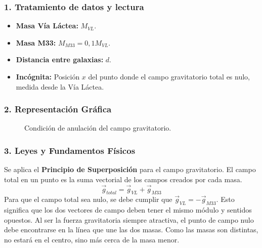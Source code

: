 \subsubsection*{1. Tratamiento de datos y lectura}
\begin{itemize}
    \item \textbf{Masa Vía Láctea:} $M_{VL}$.
    \item \textbf{Masa M33:} $M_{M33} = 0,1 M_{VL}$.
    \item \textbf{Distancia entre galaxias:} $d$.
    \item \textbf{Incógnita:} Posición $x$ del punto donde el campo gravitatorio total es nulo, medida desde la Vía Láctea.
\end{itemize}

\subsubsection*{2. Representación Gráfica}
\begin{figure}[H]
    \centering
    \caption{Condición de anulación del campo gravitatorio.}
\end{figure}

\subsubsection*{3. Leyes y Fundamentos Físicos}
Se aplica el \textbf{Principio de Superposición} para el campo gravitatorio. El campo total en un punto es la suma vectorial de los campos creados por cada masa.
$$ \vec{g}_{total} = \vec{g}_{VL} + \vec{g}_{M33} $$
Para que el campo total sea nulo, se debe cumplir que $\vec{g}_{VL} = -\vec{g}_{M33}$. Esto significa que los dos vectores de campo deben tener el mismo módulo y sentidos opuestos.
Al ser la fuerza gravitatoria siempre atractiva, el punto de campo nulo debe encontrarse en la línea que une las dos masas. Como las masas son distintas, no estará en el centro, sino más cerca de la masa menor.

